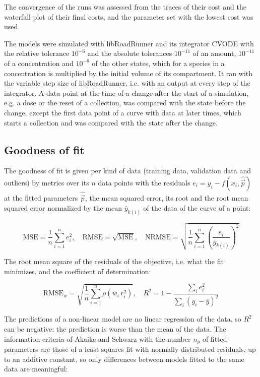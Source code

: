 \documentclass{article}
\begin{document}
The convergence of the runs was assessed from the traces of their cost and the waterfall plot of their final costs, and the parameter set with the lowest cost was used.

The models were simulated with libRoadRunner \cite{Welsh2023} and its integrator CVODE \cite{Hindmarsh2005} with the relative tolerance $10^{-6}$ and the absolute tolerances $10^{-11}$ of an amount, $10^{-11}$ of a concentration and $10^{-6}$ of the other states, which for a species in a concentration is multiplied by the initial volume of its compartment. It ran with the variable step size of libRoadRunner, i.e. with an output at every step of the integrator. A data point at the time of a change after the start of a simulation, e.g. a dose or the reset of a collection, was compared with the state before the change, except the first data point of a curve with data at later times, which starts a collection and was compared with the state after the change.

\subsection{Goodness of fit}

The goodness of fit is given per kind of data (training data, validation data and outliers) by metrics over its $n$ data points with the residuals $e_i = y_i - f(x_i, \hat{\vec{p}})$ at the fitted parameters $\hat{\vec{p}}$, the mean squared error, its root and the root mean squared error normalized by the mean $\overline{y}_{k(i)}$ of the data of the curve of a point:

\begin{equation}
\mathrm{MSE} = \frac{1}{n} \sum_{i=1}^{n} e_i^2, \quad \mathrm{RMSE} = \sqrt{\mathrm{MSE}}, \quad \mathrm{NRMSE} = \sqrt{\frac{1}{n} \sum_{i=1}^{n} \left(\frac{e_i}{\overline{y}_{k(i)}}\right)^2}
\end{equation}

The root mean square of the residuals of the objective, i.e. what the fit minimizes, and the coefficient of determination:

\begin{equation}
\mathrm{RMSE}_w = \sqrt{\frac{1}{n} \sum_{i=1}^{n} \rho\left(w_i\, r_i^2\right)}, \quad R^2 = 1 - \frac{\sum_{i} e_i^2}{\sum_{i} \left(y_i - \overline{y}\right)^2}
\end{equation}

The predictions of a non-linear model are no linear regression of the data, so $R^2$ can be negative: the prediction is worse than the mean of the data. The information criteria of Akaike \cite{Akaike1974} and Schwarz \cite{Schwarz1978} with the number $n_p$ of fitted parameters are those of a least squares fit with normally distributed residuals, up to an additive constant, so only differences between models fitted to the same data are meaningful:
\end{document}
